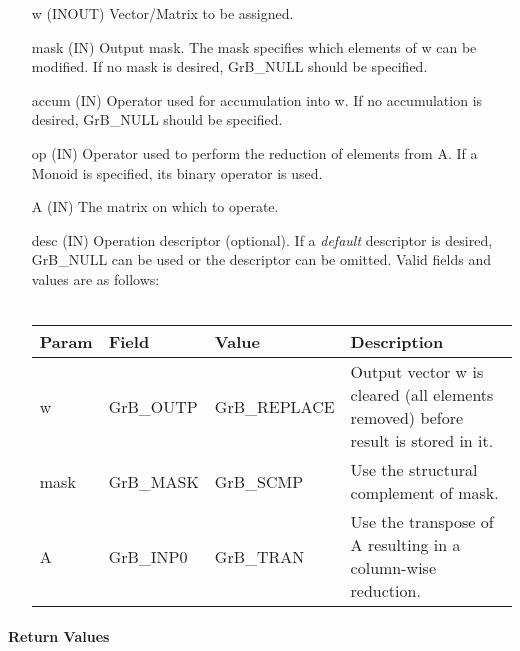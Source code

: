 \begin{itemize}[leftmargin=1.1in]
    \item[{\sf w}]     ({\sf INOUT}) Vector/Matrix to be assigned.

    \item[{\sf mask}]  ({\sf IN}) Output mask. The mask specifies which elements
    of {\sf w} can be modified. If no mask is desired, {\sf GrB\_NULL} should be specified.

    \item[{\sf accum}] ({\sf IN}) Operator used for accumulation into {\sf w}.  If no accumulation
                        is desired, {\sf GrB\_NULL} should be specified.

    \item[{\sf op}]    ({\sf IN}) Operator used to perform the reduction of elements from {\sf A}.  If a Monoid is specified, its binary operator is used.
    \item[{\sf A}]     ({\sf IN}) The matrix on which to operate.

    \item[{\sf desc}]  ({\sf IN}) Operation descriptor (optional). If a
    \emph{default} descriptor is desired, {\sf GrB\_NULL} can be
    used or the descriptor can be omitted.  Valid fields and values are as follows: \\ ~\\
    \begin{tabular}{lllp{2.5in}}
    Param & Field  & Value & Description \\
    \hline
    {\sf w}    & {\sf GrB\_OUTP} & {\sf GrB\_REPLACE} & Output vector {\sf w} is cleared (all elements removed) before result is stored in it. \\
    {\sf mask} & {\sf GrB\_MASK} & {\sf GrB\_SCMP}    & Use the structural complement of {\sf mask}. \\
    {\sf A}    & {\sf GrB\_INP0} & {\sf GrB\_TRAN}    & Use the transpose of {\sf A} 
    resulting in a column-wise reduction. \\
    \end{tabular}

\end{itemize}


\paragraph{Return Values}

